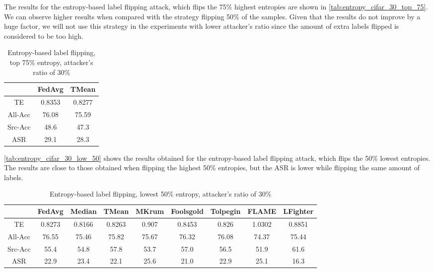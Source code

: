 The results for the entropy-based label flipping attack, which flips the 75\% highest entropies are shown in \autoref{tab:entropy_cifar_30_top_75}. We can observe higher results when compared with the strategy flipping 50\% of the samples. Given that the results do not improve by a huge factor, we will not use this strategy in the experiments with lower attacker's ratio since the amount of extra labels flipped is considered to be too high.

\begin{table}[h!]
        \centering
        \small
        \begin{adjustbox}{center}
        \begin{tabular}{|c|c|c|}
            \hline
            & FedAvg & TMean \\
            \hline
            TE & 0.8353 & 0.8277 \\
            \hline
            All-Acc & 76.08 & 75.59 \\
            \hline
            Src-Acc & 48.6 & 47.3 \\
            \hline
            ASR & 29.1 & 28.3 \\
            \hline
        \end{tabular}
        \end{adjustbox}
        \caption{Entropy-based label flipping, top 75\% entropy, attacker's ratio of 30\%}
        \label{tab:entropy_cifar_30_top_75}
    \end{table}

\autoref{tab:entropy_cifar_30_low_50} shows the results obtained for the entropy-based label flipping attack, which flips the 50\% lowest entropies. The results are close to those obtained when flipping the highest 50\% entropies, but the ASR is lower while flipping the same amount of labels.


\begin{table}[h!]
        \centering
        \small
        \begin{adjustbox}{center}
        \begin{tabular}{|c|c|c|c|c|c|c|c|c|}
            \hline
            & FedAvg & Median & TMean & MKrum & Foolsgold & Tolpegin & FLAME & LFighter \\
            \hline
            TE & 0.8273 & 0.8166 & 0.8263 & 0.907 & 0.8453 & 0.826 & 1.0302 & 0.8851 \\
            \hline
            All-Acc & 76.55 & 75.46 & 75.82 & 75.67 & 76.32 & 76.08 & 74.37 & 75.44 \\
            \hline
            Src-Acc & 55.4 & 54.8 & 57.8 & 53.7 & 57.0 & 56.5 & 51.9 & 61.6 \\
            \hline
            ASR & 22.9 & 23.4 & 22.1 & 25.6 & 21.0 & 22.9 & 25.1 & 16.3 \\
            \hline
        \end{tabular}
        \end{adjustbox}
        \caption{Entropy-based label flipping, lowest 50\% entropy, attacker's ratio of 30\%}
        \label{tab:entropy_cifar_30_low_50}
    \end{table}
    

